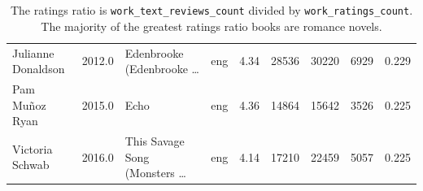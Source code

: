 \documentclass[11pt]{article}
\begin{document}
\begin{table}
\begin{tabular}{lHlHrrHHr}
                       Julianne Donaldson &                     2012.0 &                Edenbrooke (Edenbrooke \ldots &           eng &            4.34 &          28536 &               30220 &                     6929 &       0.229 \\
                           Pam Mu\~noz Ryan &                     2015.0 &                                       Echo &           eng &            4.36 &          14864 &               15642 &                     3526 &       0.225 \\
                          Victoria Schwab &                     2016.0 &  This Savage Song (Monsters \ldots &           eng &            4.14 &          17210 &               22459 &                     5057 &       0.225 \\
\bottomrule
\end{tabular}
    \caption[Greatest Ratings Ratio]{The ratings ratio is \texttt{work\_text\_reviews\_count} divided by
\texttt{work\_ratings\_count}. The majority of the greatest ratings ratio 
books are romance novels.}
     \label{tbl:greatest-ratings-ratio}
\end{table}
\end{document}
